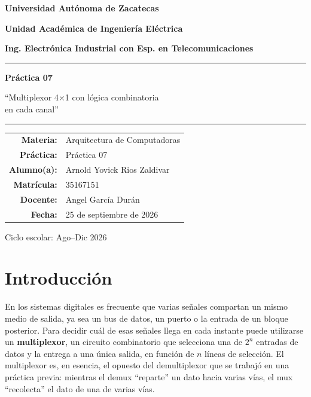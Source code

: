 \documentclass[12pt,a4paper]{article}
\title{}
\author{}
\begin{document}
\begin{titlepage}
    \centering
    \vspace*{1cm}
    {\Large\bfseries Universidad Autónoma de Zacatecas\par}
    \vspace{0.4cm}
    {\large\bfseries Unidad Académica de Ingeniería Eléctrica\par}
    {\large\bfseries Ing. Electrónica Industrial con Esp. en Telecomunicaciones\par}
    \vspace{1.5cm}
    \noindent\rule{\textwidth}{0.8pt}
    \vspace{1cm}
    {\huge\bfseries Práctica 07\par}
    \vspace{0.7cm}
    {\Large ``Multiplexor 4$\times$1 con lógica combinatoria \\ en cada canal''\par}
    \vspace{1cm}
    \noindent\rule{\textwidth}{0.8pt}
    \vspace{1.8cm}

    \begin{tabular}{r l}
        \textbf{Materia:}    & Arquitectura de Computadoras \\[0.35cm]
        \textbf{Práctica:}   & Práctica 07 \\[0.35cm]
        \textbf{Alumno(a):}  & Arnold Yovick Rios Zaldivar \\[0.35cm]
        \textbf{Matrícula:}  & 35167151 \\[0.35cm]
        \textbf{Docente:}    & Angel García Durán \\[0.35cm]
        \textbf{Fecha:}      & 25 de septiembre de 2026
    \end{tabular}

    \vfill
    Ciclo escolar: Ago--Dic 2026
    \vspace*{0.5cm}
\end{titlepage}
\setcounter{page}{1}

\section{Introducción}

En los sistemas digitales es frecuente que varias señales compartan un mismo
medio de salida, ya sea un bus de datos, un puerto o la entrada de un bloque
posterior. Para decidir cuál de esas señales llega en cada instante puede
utilizarse un \textbf{multiplexor}, un circuito combinatorio que selecciona una
de $2^n$ entradas de datos y la entrega a una única salida, en función de $n$
líneas de selección. El multiplexor es, en esencia, el opuesto del
demultiplexor que se trabajó en una práctica previa: mientras el demux
``reparte'' un dato hacia varias vías, el mux ``recolecta'' el dato de una de
varias vías.
\end{document}
